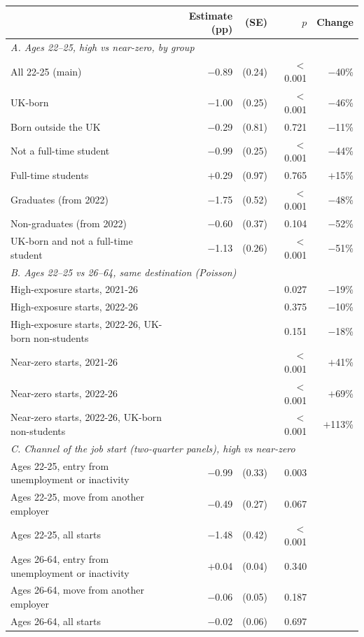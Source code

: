 \begin{tabular}{lrrrr}
\toprule
 & Estimate (pp) & (SE) & $p$ & Change \\
\midrule
\multicolumn{5}{l}{\emph{A. Ages 22--25, high vs near-zero, by group}}\\
\quad All 22-25 (main) & \ensuremath{-}0.89 & (0.24) & $<$0.001 & \ensuremath{-}40\% \\
\quad UK-born & \ensuremath{-}1.00 & (0.25) & $<$0.001 & \ensuremath{-}46\% \\
\quad Born outside the UK & \ensuremath{-}0.29 & (0.81) & 0.721 & \ensuremath{-}11\% \\
\quad Not a full-time student & \ensuremath{-}0.99 & (0.25) & $<$0.001 & \ensuremath{-}44\% \\
\quad Full-time students & \ensuremath{+}0.29 & (0.97) & 0.765 & \ensuremath{+}15\% \\
\quad Graduates (from 2022) & \ensuremath{-}1.75 & (0.52) & $<$0.001 & \ensuremath{-}48\% \\
\quad Non-graduates (from 2022) & \ensuremath{-}0.60 & (0.37) & 0.104 & \ensuremath{-}52\% \\
\quad UK-born and not a full-time student & \ensuremath{-}1.13 & (0.26) & $<$0.001 & \ensuremath{-}51\% \\
\midrule
\multicolumn{5}{l}{\emph{B. Ages 22--25 vs 26--64, same destination (Poisson)}}\\
\quad High-exposure starts, 2021-26 &  &  & 0.027 & \ensuremath{-}19\% \\
\quad High-exposure starts, 2022-26 &  &  & 0.375 & \ensuremath{-}10\% \\
\quad High-exposure starts, 2022-26, UK-born non-students &  &  & 0.151 & \ensuremath{-}18\% \\
\quad Near-zero starts, 2021-26 &  &  & $<$0.001 & \ensuremath{+}41\% \\
\quad Near-zero starts, 2022-26 &  &  & $<$0.001 & \ensuremath{+}69\% \\
\quad Near-zero starts, 2022-26, UK-born non-students &  &  & $<$0.001 & \ensuremath{+}113\% \\
\midrule
\multicolumn{5}{l}{\emph{C. Channel of the job start (two-quarter panels), high vs near-zero}}\\
\quad Ages 22-25, entry from unemployment or inactivity & \ensuremath{-}0.99 & (0.33) & 0.003 &  \\
\quad Ages 22-25, move from another employer & \ensuremath{-}0.49 & (0.27) & 0.067 &  \\
\quad Ages 22-25, all starts & \ensuremath{-}1.48 & (0.42) & $<$0.001 &  \\
\quad Ages 26-64, entry from unemployment or inactivity & \ensuremath{+}0.04 & (0.04) & 0.340 &  \\
\quad Ages 26-64, move from another employer & \ensuremath{-}0.06 & (0.05) & 0.187 &  \\
\quad Ages 26-64, all starts & \ensuremath{-}0.02 & (0.06) & 0.697 &  \\
\bottomrule
\end{tabular}
